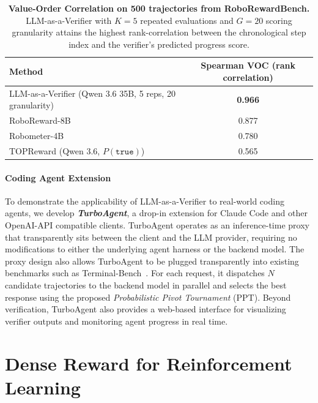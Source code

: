 \begin{table}[h]
    \centering
    \begin{tabular}{lc}
        \toprule
        \textbf{Method} & \textbf{Spearman VOC (rank correlation)} \\
        \midrule
        LLM-as-a-Verifier (Qwen 3.6 35B, 5 reps, 20 granularity) & \textbf{0.966} \\
        RoboReward-8B & 0.877 \\
        Robometer-4B & 0.780 \\
        TOPReward (Qwen 3.6, $P(\texttt{true})$) & 0.565 \\
        \bottomrule
    \end{tabular}
    \caption{\textbf{Value-Order Correlation on 500 trajectories from RoboRewardBench.} LLM-as-a-Verifier with $K{=}5$ repeated evaluations and $G{=}20$ scoring granularity attains the highest rank-correlation between the chronological step index and the verifier's predicted progress score.}
    \label{tab:voc-roboreward}
\end{table}

\paragraph{Coding Agent Extension} To demonstrate the applicability of LLM-as-a-Verifier to real-world coding agents, we develop \textbf{\textit{TurboAgent}}, a drop-in extension for Claude Code and other OpenAI-API compatible clients. TurboAgent operates as an inference-time proxy that transparently sits between the client and the LLM provider, requiring no modifications to either the underlying agent harness or the backend model. The proxy design also allows TurboAgent to be plugged transparently into existing benchmarks such as Terminal-Bench~\citep{merrill_terminal-bench_2026}. For each request, it dispatches $N$ candidate trajectories to the backend model in parallel and selects the best response using the proposed \emph{Probabilistic Pivot Tournament} (PPT). Beyond verification, TurboAgent also provides a web-based interface for visualizing verifier outputs and monitoring agent progress in real time.

\section{Dense Reward for Reinforcement Learning}
\label{sec:rl}


